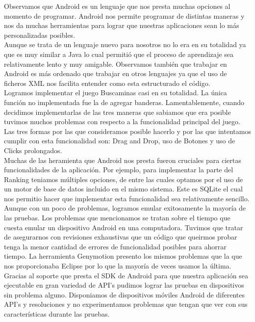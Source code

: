 \documentclass[11pt]{article} %
\begin{document}
Observamos que Android es un lenguaje que nos presta muchas opciones al momento de programar. Android nos permite programar de distintas maneras y nos da muchas herramientas para lograr que nuestras aplicaciones sean lo m\'as personalizadas posibles.
\\Aunque se trata de un lenguaje nuevo para nosotros no lo era en su totalidad ya que es muy similar a Java lo cual permiti\'o que el proceso de aprendizaje sea relativamente lento y muy amigable. Observamos tambi\'en que trabajar en Android es m\'as ordenado que trabajar en otros lenguajes ya que el uso de ficheros XML nos facilita entender como esta estructurado el c\'odigo.
\\Logramos implementar el juego Buscaminas casi en su totalidad. La \'unica funci\'on no implementada fue la de agregar banderas. Lamentablemente, cuando decidimos implementarlas de las tres maneras que sabiamos que era posible tuvimos muchos problemas con respecto a la funcionalidad principal del juego. Las tres formas por las que consideramos posible hacerlo y por las que intentamos cumplir con esta funcionalidad son: Drag and Drop, uso de Botones y uso de Clicks prolongados.
\\Muchas de las heramienta que Android nos presta fueron cruciales para ciertas funcionalidades de la aplicaci\'on. Por ejemplo, para implementar la parte del Ranking teniamos m\'ultiples opciones, de entre las cuales optamos por el uso de un motor de base de datos incluido en el mismo sistema. Este es SQLite el cual nos permitio hacer que implementar esta funcionalidad sea relativamente sencillo.
\\Aunque con un poco de problemas, logramos emular exitosamente la mayor\'ia de las pruebas. Los problemas que mencionamos se tratan sobre el tiempo que cuesta emular un dispositivo Android en una computadora. Tuvimos que tratar de asegurarnos con revisiones exhaustivas que un c\'odigo que queirmos probar tenga la menor cantidad de errores de funcionalidad posibles para ahorrar tiempo. La herramienta Genymotion presento los mismos problemas que la que nos proporcionaba Eclipse por lo que la mayor\'ia de veces usamos la \'ultima.
\\Gracias al soporte que presta el SDK de Android para que nuestra aplicaci\'on sea ejecutable en gran variedad de API's pudimos lograr las pruebas en dispositivos sin problema alguno. Disponiamos de dispositivos m\'oviles Android de diferentes API's y resoluciones y no experimentamos problemas que tengan que ver con sus caracter\'isticas durante las pruebas.
\end{document}
